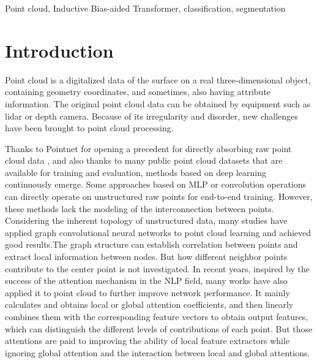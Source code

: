 \documentclass[conference]{IEEEtran}
\begin{document}
\begin{IEEEkeywords}
Point cloud, Inductive Bias-aided Transformer, classification, segmentation
\end{IEEEkeywords}

\section{Introduction}
Point cloud is a digitalized data of the surface on a real three-dimensional object, containing geometry coordinates, and sometimes, also having attribute information. The original point cloud data can be obtained by equipment such as lidar or depth camera. Because of its irregularity and disorder, new challenges have been brought to point cloud processing.


Thanks to Pointnet \cite{qi2017pointnet} for opening a precedent for directly absorbing raw point cloud data \cite{wu20153d,uy2019revisiting,yi2016scalable}, and also thanks to many public point cloud datasets that are available for training and evaluation, methods based on deep learning continuously emerge. Some approaches \cite{qi2017pointnet,qi2017pointnet++,wu2019pointconv,thomas2019kpconv,li2018pointcnn} based on MLP or convolution operations can directly operate on unstructured raw points for end-to-end training. However, these methods lack the modeling of the interconnection between points. Considering the inherent topology of unstructured data, many studies \cite{wang2019dynamic,te2018rgcnn,li2019deepgcns} have applied graph convolutional neural networks to point cloud learning and achieved good results.The graph structure can establish correlation between points and extract local information between nodes. But how different neighbor points contribute to the center point is not investigated. In recent years, inspired by the success of the attention mechanism in the NLP field, many works \cite{guo2021pct,zhao2021point,yan2020pointasnl,zhang2022patchformer,mazur2021cloud,zhong2021point} have also applied it to point cloud to further improve network performance. It mainly calculates and obtains local or global attention coefficients, and then linearly combines them with the corresponding feature vectors to obtain output features, which can distinguish the different levels of contributions  of each point. But those attentions are paid to improving the ability of local feature extractors while ignoring global attention and the interaction between local and global attentions.
\end{document}
